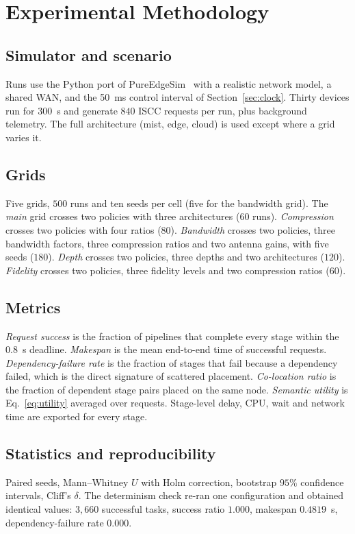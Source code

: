 \documentclass[journal,10pt]{IEEEtran}
\begin{document}
\section{Experimental Methodology}
\label{sec:exp}

\subsection{Simulator and scenario}
Runs use the Python port of PureEdgeSim~\cite{mechalikh2021pureedgesim} with a
realistic network model, a shared WAN, and the 50~ms control interval of
Section~\ref{sec:clock}. Thirty devices run for $300$~s and generate $840$
ISCC requests per run, plus background telemetry. The full architecture
(mist, edge, cloud) is used except where a grid varies it.

\subsection{Grids}
Five grids, $500$ runs and ten seeds per cell (five for the bandwidth grid).
The \emph{main} grid crosses two policies with three architectures ($60$ runs).
\emph{Compression} crosses two policies with four ratios ($80$).
\emph{Bandwidth} crosses two policies, three bandwidth factors, three
compression ratios and two antenna gains, with five seeds ($180$).
\emph{Depth} crosses two policies, three depths and two architectures ($120$).
\emph{Fidelity} crosses two policies, three fidelity levels and two compression
ratios ($60$).

\subsection{Metrics}
\emph{Request success} is the fraction of pipelines that complete every stage
within the $0.8$~s deadline. \emph{Makespan} is the mean end-to-end time of
successful requests. \emph{Dependency-failure rate} is the fraction of stages
that fail because a dependency failed, which is the direct signature of
scattered placement. \emph{Co-location ratio} is the fraction of dependent
stage pairs placed on the same node. \emph{Semantic utility} is
Eq.~\eqref{eq:utility} averaged over requests. Stage-level delay, CPU, wait and
network time are exported for every stage.

\subsection{Statistics and reproducibility}
Paired seeds, Mann--Whitney $U$ with Holm correction, bootstrap $95\%$
confidence intervals, Cliff's $\delta$. The determinism check re-ran one
configuration and obtained identical values: $3{,}660$ successful tasks,
success ratio $1.000$, makespan $0.4819$~s, dependency-failure rate $0.000$.
\end{document}
